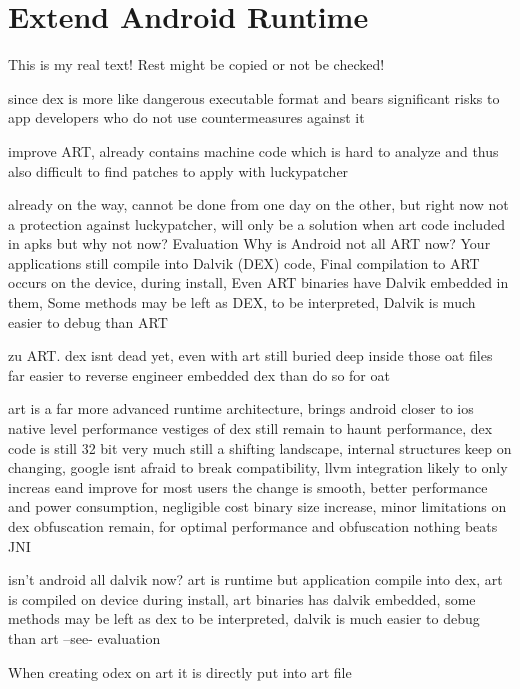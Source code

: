 \section{Extend Android Runtime} \label{section:counter-external-art}
This is my real text! Rest might be copied or not be checked!

since dex is more like dangerous executable format and bears significant risks to app developers who do not use countermeasures against it

improve ART, already contains machine code which is hard to analyze and thus also difficult to find patches to apply with luckypatcher



already on the way, cannot be done from one day on the other, but right now not a protection against luckypatcher, will only be a solution when art code included in apks
but why not now?
%
Evaluation
Why is Android not all ART now? Your applications still compile into Dalvik (DEX) code, Final compilation to ART occurs on the device, during install, Even ART binaries have Dalvik embedded in them, Some methods may be left as DEX, to be interpreted, Dalvik is much easier to debug than ART\newline
\cite{andevconDalvikART}
%

%
zu ART.
dex isnt dead yet, even with art
still buried deep inside those oat files
far easier to reverse engineer embedded dex than do so for oat

art is a far more advanced runtime architecture, brings android closer to ios native level performance
vestiges of dex still remain to haunt performance, dex code is still 32 bit
very much still a shifting landscape, internal structures keep on changing, google isnt afraid to break compatibility, llvm integration likely to only increas eand improve
for most users the change is smooth, better performance and power consumption, negligible cost binary size increase, minor limitations on dex obfuscation remain, for optimal performance and obfuscation nothing beats JNI

isn't android all dalvik now?
art is runtime but application compile into dex, art is compiled on device during install, art binaries has dalvik embedded, some methods may be left as dex to be interpreted, dalvik is much easier to debug than art --see- evaluation \newline

When creating odex on art it is directly put into art file

\cite{andevconDalvikART}
%
